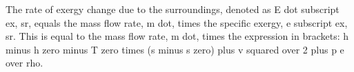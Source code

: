 The rate of exergy change due to the surroundings, denoted as E dot subscript ex, sr, equals the mass flow rate, m dot, times the specific exergy, e subscript ex, sr. This is equal to the mass flow rate, m dot, times the expression in brackets: h minus h zero minus T zero times (s minus s zero) plus v squared over 2 plus p e over rho.
